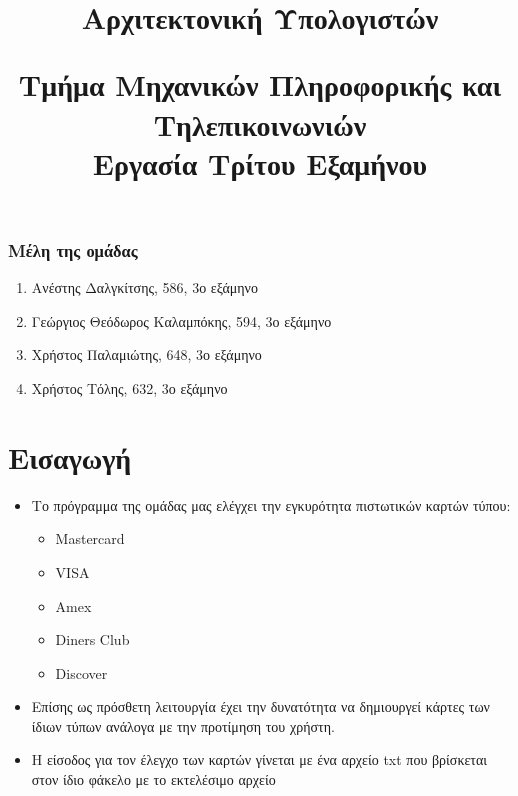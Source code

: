 \documentclass[10pt,a4paper]{article}
\begin{document}
\title{Αρχιτεκτονική Υπολογιστών \\ 
	\begin{small}
	Τμήμα Μηχανικών Πληροφορικής και Τηλεπικοινωνιών \\ Εργασία Τρίτου Εξαμήνου
	\end{small}}
\maketitle

\begin{small}
	\subsubsection*{Μέλη της ομάδας}
		\begin{enumerate}
		\item Ανέστης Δαλγκίτσης, 586, 3ο εξάμηνο
		\item Γεώργιος Θεόδωρος Καλαμπόκης, 594, 3ο εξάμηνο
		\item Χρήστος Παλαμιώτης, 648, 3ο εξάμηνο
		\item Χρήστος Τόλης, 632, 3ο εξάμηνο
	\end{enumerate}
\end{small}

\section*{Εισαγωγή}
\begin{itemize}
\item Το πρόγραμμα της ομάδας μας ελέγχει την εγκυρότητα πιστωτικών καρτών τύπου:
\latintext 
\begin{itemize}
\item Mastercard
\item VISA
\item Amex
\item Diners Club
\item Discover
\end{itemize}
\greektext

\item Επίσης ως πρόσθετη λειτουργία έχει την δυνατότητα να δημιουργεί κάρτες των ίδιων τύπων ανάλογα με την προτίμηση του χρήστη.

\item Η είσοδος για τον έλεγχο των καρτών γίνεται με ένα αρχείο \latintext txt \greektext που βρίσκεται στον ίδιο φάκελο με το εκτελέσιμο αρχείο
\end{itemize}
\end{document}
